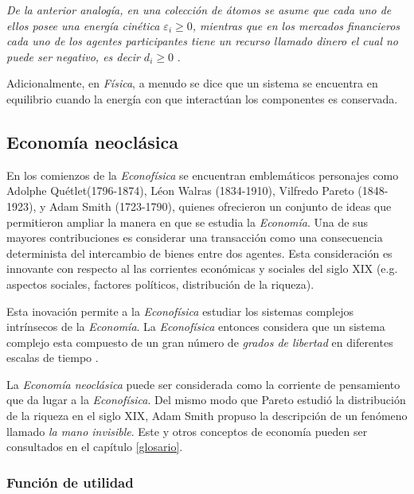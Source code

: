 \textit{De la anterior analogía, en una colección de átomos se asume que cada uno de ellos posee una energía cinética $\mathit{\varepsilon}_{i} \geqslant 0 $, mientras que en los mercados financieros cada uno de los agentes participantes tiene un recurso llamado dinero el cual no puede ser negativo, es decir  $\mathit{d}_{i} \geqslant 0 $} \citep[][pagina 149]{cottrell_classical_2009}.




Adicionalmente, en \textit{Física}, a menudo se dice que un sistema se encuentra en equilibrio cuando la energía con que interactúan los componentes es conservada. 


\subsection{Economía neoclásica} 

En los comienzos de la \textit{Econofísica} se encuentran emblemáticos personajes como Adolphe Quétlet(1796-1874), Léon Walras (1834-1910), Vilfredo Pareto (1848-1923), y Adam Smith (1723-1790), quienes ofrecieron un conjunto de ideas que permitieron ampliar la manera en que se estudia la \textit{Economía}.
Una de sus mayores contribuciones es considerar una transacción como una consecuencia determinista del intercambio de bienes entre dos agentes.
Esta consideración es innovante con respecto al las corrientes económicas y sociales del siglo XIX (e.g. aspectos sociales,  factores políticos, distribución de la riqueza). 

Esta inovación permite a la \textit{Econofísica} estudiar los sistemas complejos intrínsecos de la \textit{Economía}. La \textit{Econofísica} entonces considera que un sistema complejo esta compuesto de un gran número de \textit{grados de libertad} en diferentes escalas de tiempo  \citep[][pagina 17]{richmond}.

La \textit{Economía neoclásica} puede ser considerada como la corriente de pensamiento que da lugar a la \textit{Econofísica}. Del mismo modo que Pareto estudió la distribución de la riqueza en el siglo XIX, Adam Smith propuso la descripción de un fenómeno llamado \textit{la mano invisible}. 
Este y otros conceptos de economía pueden ser consultados en el capítulo \ref{glosario}.

\subsubsection*{Función de utilidad}

